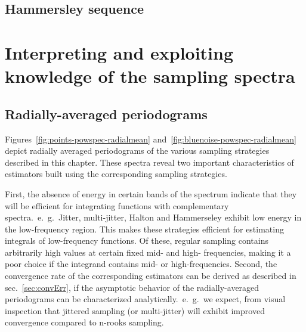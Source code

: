 \documentclass[11pt,fleqn]{book} %
\newcommand{\TBC} {}
\begin{document}
\subsection{Hammersley sequence}
\TBC

%

%



\section{Interpreting and exploiting knowledge of the sampling spectra}

\subsection{Radially-averaged periodograms}
Figures~\ref{fig:points-powspec-radialmean} and~\ref{fig:bluenoise-powspec-radialmean} depict radially averaged periodograms of the various sampling strategies described in this chapter. These spectra reveal two important characteristics of estimators built using the corresponding sampling strategies. 

First, the absence of energy in certain bands of the spectrum indicate that they will be efficient for integrating functions with complementary spectra.~e.~g.~Jitter, multi-jitter, Halton and Hammerseley exhibit low energy in the low-frequency region. This makes these strategies efficient for estimating integrals of low-frequency functions. Of these, regular sampling contains arbitrarily high values at certain fixed mid- and high- frequencies, making it a poor choice if the integrand contains mid- or high-frequencies. 
Second, the convergence rate of the corresponding estimators can be derived as described in sec.~\ref{sec:convErr}, if the asymptotic behavior of the radially-averaged periodograms can be characterized analytically.~e.~g.~we expect, from visual inspection that jittered sampling (or multi-jitter) will exhibit improved convergence compared to n-rooks sampling. 
\end{document}
